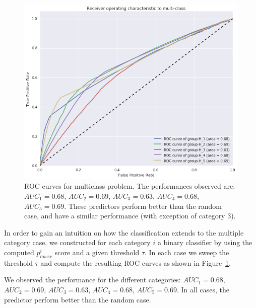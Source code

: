 \begin{figure}
\centering
\includegraphics[width=0.75\columnwidth]{figures/ROC_multiclass/ROC_multiclass.png}
\caption{ROC curves for multiclass problem. The performances observed are: $AUC_1 = 0.68$, $AUC_2 = 0.69$, $AUC_3 = 0.63$, $AUC_4 = 0.68$, $AUC_5 = 0.69$. These predictors perform better than the random case, and have a similar performance (with exception of category 3).}
\label{roc_multiple_categories}
\end{figure}

In order to gain an intuition on how the classification extends to the multiple category case, we constructed for each category $i$ a binary classifier by using the computed $p^i_{lower}$ score and a given threshold $\tau$. In each case we sweep the threshold $\tau$ and compute the resulting ROC curves as shown in Figure~\ref{roc_multiple_categories}.

We observed the performance for the different categories: $AUC_1 = 0.68$, $AUC_2 = 0.69$, $AUC_3=0.63$, $AUC_4 = 0.68$, $AUC_5 = 0.69$. In all cases, the predictor perform better than the random case.


